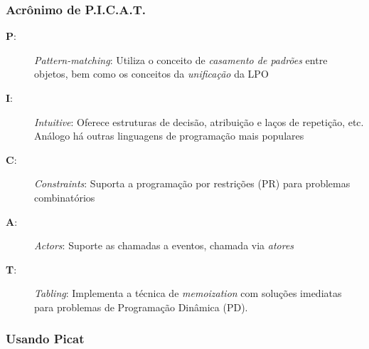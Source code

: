 \begin{frame}	 [fragile]

   \frametitle{Acrônimo de \textbf{P.I.C.A.T.}}
  
  
  \begin{block}{}
  		\begin{description}

 \item [\textbf{P}:] \textit{Pattern-matching}:  Utiliza o conceito de \textit{casamento de 
padrões} entre objetos, bem como os conceitos da \textit{unificação} da LPO

\item [\textbf{I}:] \textit{Intuitive}: Oferece estruturas de decisão, atribuição e laços de
repetição, etc. Análogo há outras linguagens de programação mais populares

\item [\textbf{C}:] \textit{Constraints}: Suporta a programação por restrições (PR) para 	
problemas combinatórios

 \item [\textbf{A}:] \textit{Actors}: Suporte as chamadas a eventos, chamada via \textit{atores}

\item [\textbf{T}:] \textit{Tabling}: Implementa a técnica de \textit{memoization} com 
soluções imediatas para problemas de Programação Dinâmica (PD).

  \end{description}	
 \end{block}
  
\end{frame}



\subsubsection{Usando Picat}

